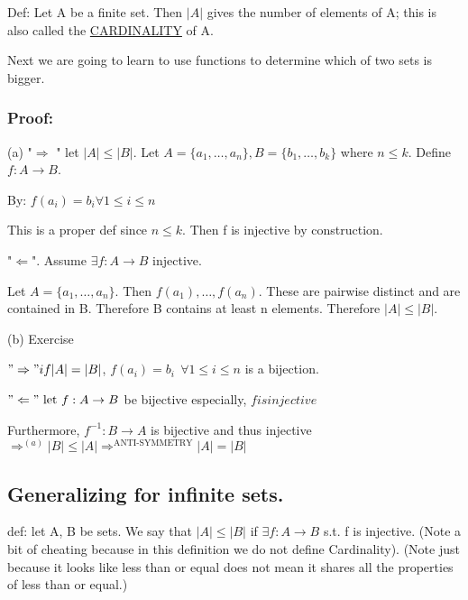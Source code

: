 \documentclass[class=scrartcl, crop=false]{standalone}
\begin{document}
Def: Let A be a finite set. Then $|A|$ gives the number of elements of A; this is also called the \underline{CARDINALITY} of A.

Next we are going to learn to use functions to determine which of two sets is bigger.


\subsubsection{Proof:}

(a) "$\Rightarrow$ " let $|A| \leq |B|.$ Let $A = \{a_1, \dots, a_n\}, B = \{b_1, \dots, b_k\}$ where $n \leq k$.
Define $f:A \to B$.

By: $f(a_i) = b_i \forall 1 \leq i \leq n$

This is a proper def since  $n \leq k$. Then f is injective by construction.

"$\Leftarrow$". Assume $\exists f: A \to B$ injective.

Let $A = \{a_1, \dots, a_n\}.$ Then $f(a_1), \dots, f(a_n)$. These are pairwise distinct and are contained in B. Therefore B contains at least n elements. Therefore  $|A| \leq |B|$.

(b) Exercise

$"\Rightarrow" if |A| = |B|$, $f(a_i) = b_i \ \ \forall 1 \leq i \leq n$ is a bijection.

$"\Leftarrow" \ \text{let} \ f: A \to B$ be bijective especially, $f is injective $

Furthermore,  $f^{-1}: B \to A$ is bijective and thus injective $\Rightarrow^{(a)} |B| \leq |A| \Rightarrow^{\text{ANTI-SYMMETRY}} |A| = |B|$

\subsection*{Generalizing for infinite sets.}

def: let A, B be sets. We say that  $|A| \leq |B|$ if $\exists f:A \to B$ s.t. f is injective. (Note a bit of cheating because in this definition we do not define Cardinality). (Note just because it looks like less than or equal does not mean it shares all the properties of less than or equal.)
\end{document}
